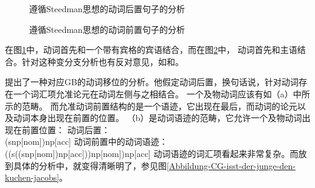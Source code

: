 \begin{figure}
\centerline{%
}
\caption{\label{Abbildung-CG-der-Mann-der-Frau-das-Buch-gibt}遵循Steedman思想的动词后置句子的分析}
\end{figure}%
\begin{figure}
\centerline{%
}
\caption{\label{Abbildung-CG-gibt-der-Mann-der-Frau-das-Buch}遵循Steedman思想的动词前置句子的分析}
\end{figure}%
在图\ref{Abbildung-CG-der-Mann-der-Frau-das-Buch-gibt}中，动词首先和一个带有宾格的宾语结合，而在图\ref{Abbildung-CG-gibt-der-Mann-der-Frau-das-Buch}中，
动词首先和主语结合。针对这种变分支分析也有反对意见，如和。

\citet{Jacobs91a}提出了一种对应GB\indexgbc 的动词移位的分析。他假定动词后置，换句话说，针对动词存在一个词汇项允准论元在动词左侧与之相结合。
一个及物动词应该有如（a）中所示的范畴。
而允准动词前置结构的是一个语迹，它出现在最后，而动词的论元以及动词本身出现在前置的位置。
（b）是动词语迹的范畴，它允许一个及物动词出现在前置位置：
\eal
\ex 动词后置：\\
    (s\bs np[nom])\bs np[acc]
\ex 动词前置中的动词语迹：\\
    ((s\bs ((s\bs np[nom])\bs np[acc]))\bs np[nom])\bs np[acc]
\zl
动词语迹的词汇项看起来非常复杂。而放到具体的分析中，就变得清晰明了，参见图\vref{Abbildung-CG-isst-der-junge-den-kuchen-jacobs}。


